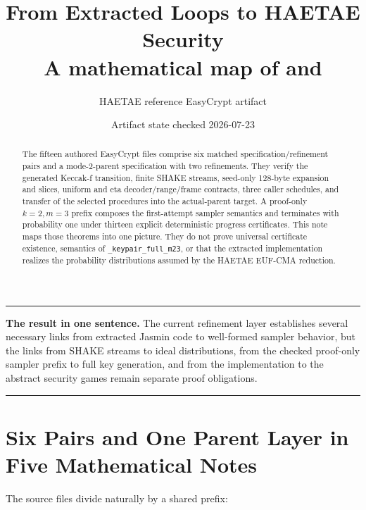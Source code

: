 \documentclass[11pt]{article}
\title{From Extracted Loops to HAETAE Security\\
\large A mathematical map of \code{spec/*.ec} and \code{refinement/*.ec}}
\author{HAETAE reference EasyCrypt artifact}
\date{Artifact state checked 2026-07-23}
\theoremstyle{definition}
\theoremstyle{plain}
\theoremstyle{remark}
\newcommand{\code}[1]{\nolinkurl{#1}}
\newenvironment{resultbox}
  {\begin{center}\begin{minipage}{0.94\linewidth}\color{artifactgreen}\hrule\vspace{0.6em}\color{black}}
  {\vspace{0.6em}\color{artifactgreen}\hrule\end{minipage}\end{center}}
\begin{document}
\maketitle

\begin{abstract}
The fifteen authored EasyCrypt files comprise six matched
specification/refinement pairs and a mode-2-parent specification with two
refinements.  They verify the generated Keccak-f transition, finite SHAKE
streams, seed-only 128-byte expansion and slices, uniform and eta
decoder/range/frame contracts, three caller schedules, and transfer of the
selected procedures into the actual-parent target.  A proof-only \(k=2,m=3\)
prefix composes the first-attempt sampler semantics and terminates with
probability one under thirteen explicit deterministic progress certificates.
This note maps those theorems into one picture.  They do not prove universal
certificate existence, semantics of \code{_keypair_full_m23}, or that the
extracted implementation realizes the probability distributions assumed by
the HAETAE EUF-CMA reduction.
\end{abstract}

\begin{resultbox}
\textbf{The result in one sentence.}
The current refinement layer establishes several necessary links from
extracted Jasmin code to well-formed sampler behavior, but the links from
SHAKE streams to ideal distributions, from the checked proof-only sampler
prefix to full key generation, and from the implementation to the abstract
security games remain separate proof obligations.
\end{resultbox}

\section{Six Pairs and One Parent Layer in Five Mathematical Notes}

The source files divide naturally by a shared prefix:
\end{document}
